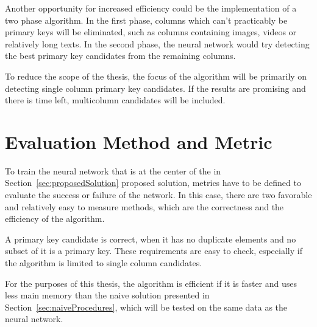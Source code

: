 \documentclass[a4paper]{article}
\begin{document}
Another opportunity for increased efficiency could be the implementation of a two phase algorithm. In the first phase, columns which can't practicably be primary keys will be eliminated, such as columns containing images, videos or relatively long texts. In the second phase, the neural network would try detecting the best primary key candidates from the remaining columns.

To reduce the scope of the thesis, the focus of the algorithm will be primarily on detecting single column primary key candidates. If the results are promising and there is time left, multicolumn candidates will be included.


\section{Evaluation Method and Metric}
To train the neural network that is at the center of the in Section~\ref{sec:proposedSolution} proposed solution, metrics have to be defined to evaluate the success or failure of the network. In this case, there are two favorable and relatively easy to measure methods, which are the correctness and the efficiency of the algorithm.

A primary key candidate is correct, when it has no duplicate elements and no subset of it is a primary key. These requirements are easy to check, especially if the algorithm is limited to single column candidates.

For the purposes of this thesis, the algorithm is efficient if it is faster and uses less main memory than the naive solution presented in Section~\ref{sec:naiveProcedures}, which will be tested on the same data as the neural network.
\end{document}

